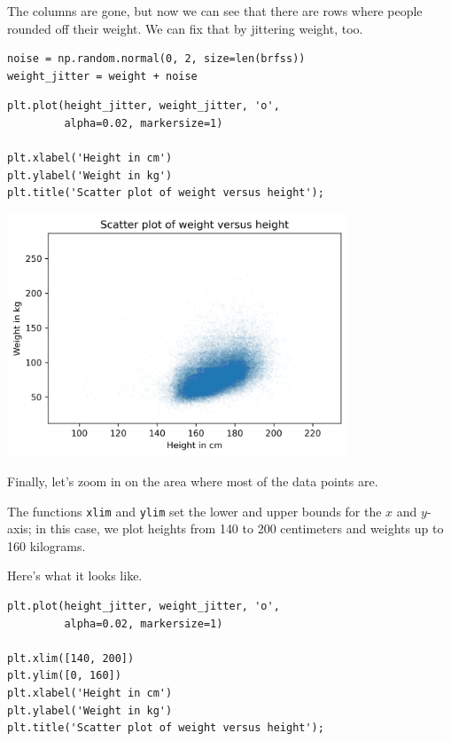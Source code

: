 The columns are gone, but now we can see that there are rows where
people rounded off their weight. We can fix that by jittering weight,
too.

\begin{lstlisting}[]
noise = np.random.normal(0, 2, size=len(brfss))
weight_jitter = weight + noise
\end{lstlisting}

\begin{lstlisting}[]
plt.plot(height_jitter, weight_jitter, 'o', 
         alpha=0.02, markersize=1)

plt.xlabel('Height in cm')
plt.ylabel('Weight in kg')
plt.title('Scatter plot of weight versus height');
\end{lstlisting}

\begin{center}
\includegraphics[width=4in]{09_relationships_files/09_relationships_24_0.png}
\end{center}

Finally, let's zoom in on the area where most of the data points are.

The functions \passthrough{\lstinline!xlim!} and
\passthrough{\lstinline!ylim!} set the lower and upper bounds for the
\(x\) and \(y\)-axis; in this case, we plot heights from 140 to 200
centimeters and weights up to 160 kilograms.

Here's what it looks like.

\begin{lstlisting}[]
plt.plot(height_jitter, weight_jitter, 'o', 
         alpha=0.02, markersize=1)

plt.xlim([140, 200])
plt.ylim([0, 160])
plt.xlabel('Height in cm')
plt.ylabel('Weight in kg')
plt.title('Scatter plot of weight versus height');
\end{lstlisting}

